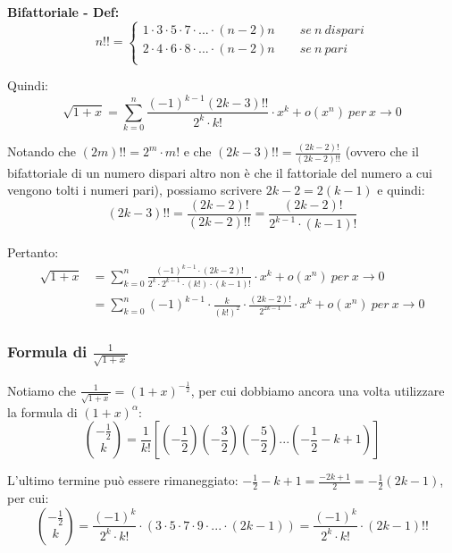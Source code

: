 \documentclass{article}
\begin{document}
\noindent\textbf{Bifattoriale - Def:} 
\begin{equation*}
    n!! = \begin{cases}
        1 \cdot 3 \cdot 5 \cdot 7 \cdot ... \cdot (n - 2)n \qquad se \ n \ dispari \\
        2 \cdot 4 \cdot 6 \cdot 8 \cdot ... \cdot (n - 2)n \qquad se \ n \ pari \\
    \end{cases}
\end{equation*}

\noindent Quindi: 
\begin{equation*}
    \sqrt{1 + x} = \sum_{k = 0}^n \frac{(-1)^{k - 1}(2k - 3)!!}{2^k \cdot k!} \cdot x^k + o(x^n) \ per \ x \to 0
\end{equation*}

\noindent Notando che $(2m)!! = 2^m \cdot m!$ e che $(2k - 3)!! = \frac{(2k - 2)!}{(2k - 2)!!}$ (ovvero che il bifattoriale di un numero dispari altro non è che il fattoriale del numero a cui vengono tolti i numeri pari), possiamo scrivere $2k - 2 = 2(k - 1)$ e quindi:
\begin{equation*}
    (2k - 3)!! = \frac{(2k - 2)!}{(2k - 2)!!} = \frac{(2k - 2)!}{2^{k - 1} \cdot (k - 1)!}
\end{equation*}

\noindent Pertanto:
\begin{align*}
    \sqrt{1 + x} &= \sum_{k = 0}^n \frac{(-1)^{k - 1} \cdot (2k - 2)!}{2^k \cdot 2^{k - 1} \cdot (k!) \cdot (k - 1)!} \cdot x^k + o(x^n)  \ per \ x \to 0 \\
    &= \sum_{k = 0}^n (-1)^{k - 1} \cdot \frac{k}{(k!)^2} \cdot \frac{(2k - 2)!}{2^{2k - 1}} \cdot x^k + o(x^n) \ per \ x \to 0
\end{align*}

\subsubsection{Formula di $\frac{1}{\sqrt{1 + x}}$}
Notiamo che $\frac{1}{\sqrt{1 + x}} = (1 + x)^{-\frac{1}{2}}$, per cui dobbiamo ancora una volta utilizzare la formula di $(1 + x)^\alpha$:
\begin{equation*}
    \binom{-\frac{1}{2}}{k} = \frac{1}{k!}\left[\left(-\frac{1}{2}\right)\left(-\frac{3}{2}\right)\left(-\frac{5}{2}\right)...\left(-\frac{1}{2} - k + 1\right)\right]
\end{equation*}

\noindent L'ultimo termine può essere rimaneggiato: $-\frac{1}{2} - k + 1 = \frac{-2k + 1}{2} = -\frac{1}{2}(2k - 1)$, per cui:
\begin{equation*}
    \binom{-\frac{1}{2}}{k} = \frac{(-1)^k}{2^k \cdot k!} \cdot (3 \cdot 5 \cdot 7 \cdot 9 \cdot ... \cdot (2k - 1)) = \frac{(-1)^k}{2^k \cdot k!} \cdot (2k - 1)!!
\end{equation*}
\end{document}
